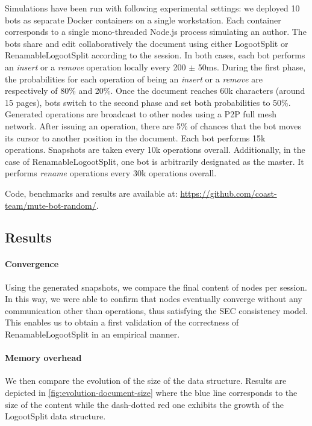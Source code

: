 \documentclass[sigplan,10pt,authorversion]{acmart}
\begin{document}
Simulations have been run with following experimental settings: we deployed 10 bots as separate Docker containers on a single workstation.
Each container corresponds to a single mono-threaded Node.js process simulating an author.
The bots share and edit collaboratively the document using either LogootSplit or RenamableLogootSplit according to the session.
In both cases, each bot performs an \emph{insert} or a \emph{remove} operation locally every 200 $\pm$ 50ms.
During the first phase, the probabilities for each operation of being an \emph{insert} or a \emph{remove} are respectively of 80\% and 20\%.
Once the document reaches 60k characters (around 15 pages), bots switch to the second phase and set both probabilities to 50\%.
Generated operations are broadcast to other nodes using a \ac{P2P} full mesh network.
After issuing an operation, there are 5\% of chances that the bot moves its cursor to another position in the document.
Each bot performs 15k operations.
Snapshots are taken every 10k operations overall.
Additionally, in the case of RenamableLogootSplit, one bot is arbitrarily designated as the master.
It performs \emph{rename} operations every 30k operations overall.

Code, benchmarks and results are available at: \url{https://github.com/coast-team/mute-bot-random/}.

\subsection{Results}

\paragraph{Convergence}

Using the generated snapshots, we compare the final content of nodes per session.
In this way, we were able to confirm that nodes eventually converge without any communication other than operations, thus satisfying the \ac{SEC} consistency model.
This enables us to obtain a first validation of the correctness of RenamableLogootSplit in an empirical manner.

\paragraph{Memory overhead}

We then compare the evolution of the size of the data structure.
Results are depicted in \autoref{fig:evolution-document-size} where the blue line corresponds to the size of the content while the dash-dotted red one exhibits the growth of the LogootSplit data structure.
\end{document}
